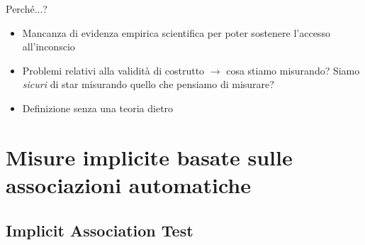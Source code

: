 \documentclass{beamer}
\begin{document}
\begin{frame}{Perché...?}
	\begin{itemize}
		\item Mancanza di evidenza empirica scientifica per poter sostenere l'accesso all'inconscio 
		\item Problemi relativi alla validità di costrutto $\rightarrow$ cosa stiamo misurando? Siamo \emph{sicuri} di star misurando quello che pensiamo di misurare?  
		\item Definizione senza una teoria dietro 
	\end{itemize}
\end{frame}

\section[Associazioni automatiche]{Misure implicite basate sulle associazioni automatiche}

\subsection{Implicit Association Test}

%	
%	
\end{document}

